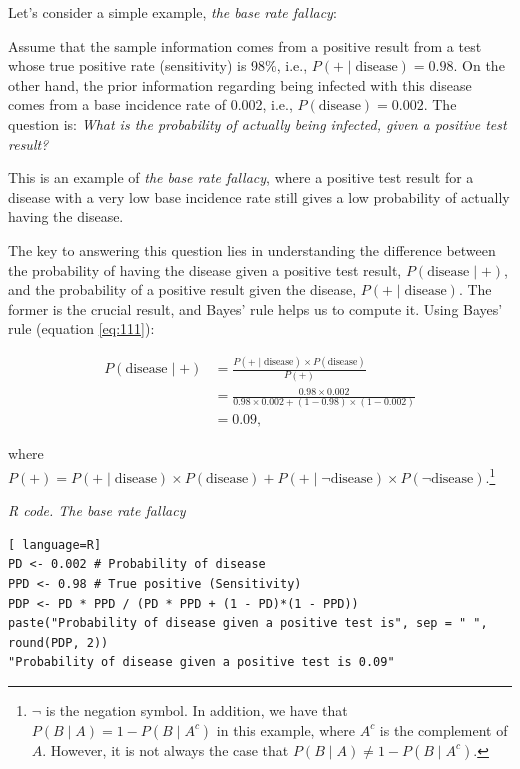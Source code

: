 Let's consider a simple example, \textit{the base rate fallacy}:

Assume that the sample information comes from a positive result from a test whose true positive rate (sensitivity) is 98\%, i.e., \( P(+ \mid \text{disease}) = 0.98 \). On the other hand, the prior information regarding being infected with this disease comes from a base incidence rate of 0.002, i.e., \( P(\text{disease}) = 0.002 \). The question is: \textit{What is the probability of actually being infected, given a positive test result?}

This is an example of \textit{the base rate fallacy}, where a positive test result for a disease with a very low base incidence rate still gives a low probability of actually having the disease.

The key to answering this question lies in understanding the difference between the probability of having the disease given a positive test result, \( P(\text{disease} \mid +) \), and the probability of a positive result given the disease, \( P(+ \mid \text{disease}) \). The former is the crucial result, and Bayes' rule helps us to compute it. Using Bayes' rule (equation \ref{eq:111}):

\begin{align*}
	P(\text{disease}\mid +) & = \frac{P(+\mid \text{disease})\times P(\text{disease})}{P(+)}\\
	& = \frac{0.98 \times 0.002}{0.98 \times 0.002 + (1-0.98) \times (1-0.002)}\\
	& =0.09, 
\end{align*}

where $P(+)=P(+\mid \text{disease})\times P(\text{disease})+P(+\mid \lnot\text{disease})\times P( \lnot\text{disease})$.\footnote{$\lnot$ is the negation symbol. In addition, we have that $P(B\mid A)=1-P(B\mid A^c)$ in this example, where $A^c$ is the complement of $A$. However, it is not always the case that $P(B\mid A)\neq 1-P(B\mid A^c)$.}

\begin{tcolorbox}[enhanced,width=4.67in,center upper,
	fontupper=\large\bfseries,drop shadow southwest,sharp corners]
\textit{R code. The base rate fallacy}
\begin{VF}
\begin{lstlisting}[ language=R]
PD <- 0.002 # Probability of disease
PPD <- 0.98 # True positive (Sensitivity)
PDP <- PD * PPD / (PD * PPD + (1 - PD)*(1 - PPD))
paste("Probability of disease given a positive test is", sep = " ", round(PDP, 2))
"Probability of disease given a positive test is 0.09"
\end{lstlisting}
\end{VF}
\end{tcolorbox}

